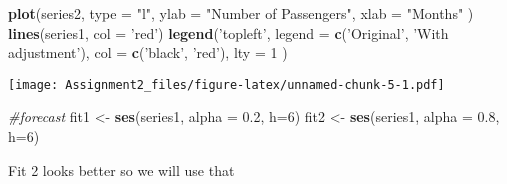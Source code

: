 \documentclass[
]{article}
\newenvironment{Shaded}{\begin{snugshade}}{\end{snugshade}}
\newcommand{\CommentTok}[1]{\textcolor[rgb]{0.56,0.35,0.01}{\textit{#1}}}
\newcommand{\DataTypeTok}[1]{\textcolor[rgb]{0.13,0.29,0.53}{#1}}
\newcommand{\DecValTok}[1]{\textcolor[rgb]{0.00,0.00,0.81}{#1}}
\newcommand{\FloatTok}[1]{\textcolor[rgb]{0.00,0.00,0.81}{#1}}
\newcommand{\KeywordTok}[1]{\textcolor[rgb]{0.13,0.29,0.53}{\textbf{#1}}}
\newcommand{\NormalTok}[1]{#1}
\newcommand{\OperatorTok}[1]{\textcolor[rgb]{0.81,0.36,0.00}{\textbf{#1}}}
\newcommand{\StringTok}[1]{\textcolor[rgb]{0.31,0.60,0.02}{#1}}
\begin{document}
\begin{Shaded}
\end{Shaded}

\begin{Shaded}
\begin{Highlighting}[]
\KeywordTok{plot}\NormalTok{(series2, }\DataTypeTok{type =} \StringTok{"l"}\NormalTok{, }\DataTypeTok{ylab =} \StringTok{"Number of Passengers"}\NormalTok{, }\DataTypeTok{xlab =} \StringTok{"Months"}\NormalTok{ )}
\KeywordTok{lines}\NormalTok{(series1, }\DataTypeTok{col =} \StringTok{'red'}\NormalTok{)}
\KeywordTok{legend}\NormalTok{(}\StringTok{'topleft'}\NormalTok{, }\DataTypeTok{legend =} \KeywordTok{c}\NormalTok{(}\StringTok{'Original'}\NormalTok{, }\StringTok{'With adjustment'}\NormalTok{), }
       \DataTypeTok{col =} \KeywordTok{c}\NormalTok{(}\StringTok{'black'}\NormalTok{, }\StringTok{'red'}\NormalTok{), }\DataTypeTok{lty =} \DecValTok{1}\NormalTok{ )}
\end{Highlighting}
\end{Shaded}

\texttt{[image: Assignment2\_files/figure-latex/unnamed-chunk-5-1.pdf]}

\begin{Shaded}
\begin{Highlighting}[]
\CommentTok{#forecast}
\NormalTok{fit1  <-}\StringTok{ }\KeywordTok{ses}\NormalTok{(series1, }\DataTypeTok{alpha =} \FloatTok{0.2}\NormalTok{, }\DataTypeTok{h=}\DecValTok{6}\NormalTok{)}
\NormalTok{fit2  <-}\StringTok{ }\KeywordTok{ses}\NormalTok{(series1, }\DataTypeTok{alpha =} \FloatTok{0.8}\NormalTok{, }\DataTypeTok{h=}\DecValTok{6}\NormalTok{)}
\end{Highlighting}
\end{Shaded}

Fit 2 looks better so we will use that
\end{document}
